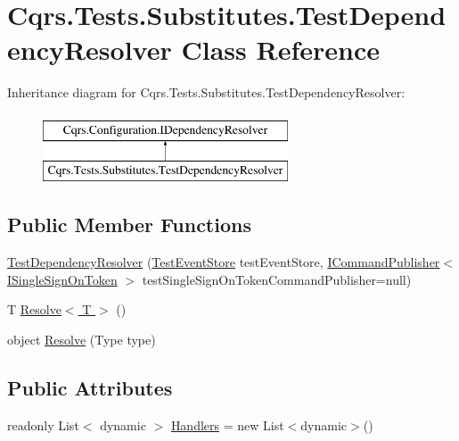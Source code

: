 \hypertarget{classCqrs_1_1Tests_1_1Substitutes_1_1TestDependencyResolver}{}\section{Cqrs.\+Tests.\+Substitutes.\+Test\+Dependency\+Resolver Class Reference}
\label{classCqrs_1_1Tests_1_1Substitutes_1_1TestDependencyResolver}
Inheritance diagram for Cqrs.\+Tests.\+Substitutes.\+Test\+Dependency\+Resolver\+:\begin{figure}[H]
\begin{center}
\leavevmode
\includegraphics[height=2.000000cm]{classCqrs_1_1Tests_1_1Substitutes_1_1TestDependencyResolver}
\end{center}
\end{figure}
\subsection*{Public Member Functions}
\begin{DoxyCompactItemize}
\item 
\hyperlink{classCqrs_1_1Tests_1_1Substitutes_1_1TestDependencyResolver_ad2c04971107ccbd80aa3f5c0440438cb_ad2c04971107ccbd80aa3f5c0440438cb}{Test\+Dependency\+Resolver} (\hyperlink{classCqrs_1_1Tests_1_1Substitutes_1_1TestEventStore}{Test\+Event\+Store} test\+Event\+Store, \hyperlink{interfaceCqrs_1_1Commands_1_1ICommandPublisher}{I\+Command\+Publisher}$<$ \hyperlink{interfaceCqrs_1_1Authentication_1_1ISingleSignOnToken}{I\+Single\+Sign\+On\+Token} $>$ test\+Single\+Sign\+On\+Token\+Command\+Publisher=null)
\item 
T \hyperlink{classCqrs_1_1Tests_1_1Substitutes_1_1TestDependencyResolver_a67090a882241fa6a881d49c91c95cad7_a67090a882241fa6a881d49c91c95cad7}{Resolve$<$ T $>$} ()
\item 
object \hyperlink{classCqrs_1_1Tests_1_1Substitutes_1_1TestDependencyResolver_a05767824475ea6affbf6f70cf5b1fd06_a05767824475ea6affbf6f70cf5b1fd06}{Resolve} (Type type)
\end{DoxyCompactItemize}
\subsection*{Public Attributes}
\begin{DoxyCompactItemize}
\item 
readonly List$<$ dynamic $>$ \hyperlink{classCqrs_1_1Tests_1_1Substitutes_1_1TestDependencyResolver_a6fd9194240dd3d95fec9ba3788ac67e4_a6fd9194240dd3d95fec9ba3788ac67e4}{Handlers} = new List$<$dynamic$>$()
\end{DoxyCompactItemize}
